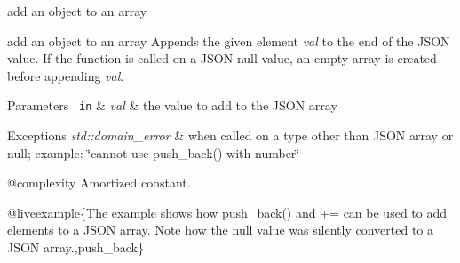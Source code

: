 add an object to an array 

add an object to an array Appends the given element {\itshape val} to the end of the J\+S\+ON value. If the function is called on a J\+S\+ON null value, an empty array is created before appending {\itshape val}.


\begin{DoxyParams}[1]{Parameters}
\mbox{\texttt{ in}}  & {\em val} & the value to add to the J\+S\+ON array\\
\hline
\end{DoxyParams}

\begin{DoxyExceptions}{Exceptions}
{\em std\+::domain\+\_\+error} & when called on a type other than J\+S\+ON array or null; example\+: {\ttfamily \char`\"{}cannot use push\+\_\+back() with number\char`\"{}}\\
\hline
\end{DoxyExceptions}
@complexity Amortized constant.

@liveexample\{The example shows how {\ttfamily \mbox{\hyperlink{classnlohmann_1_1basic__json_ac8e523ddc8c2dd7e5d2daf0d49a9c0d7}{push\+\_\+back()}}} and {\ttfamily +=} can be used to add elements to a J\+S\+ON array. Note how the {\ttfamily null} value was silently converted to a J\+S\+ON array.,push\+\_\+back\}

